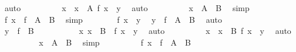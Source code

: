 \begin{isabellebody}
\begin{exercise}[subtitle=Svojstva funkcija]
\ auto\isanewline
\ \ \ \ \ \ \isamarkupfalse%
\ \isamarkupfalse%
\ x\ \ {\isachardoublequoteopen}x\ {\isasymin}\ A{\isachardoublequoteclose}\ {\isachardoublequoteopen}f\ x\ {\isacharequal}{\kern0pt}\ y{\isachardoublequoteclose}\ \isamarkupfalse%
\ auto\isanewline
\ \ \ \ \ \ \isamarkupfalse%
\ \isamarkupfalse%
\ {\isachardoublequoteopen}x\ {\isasymin}\ A\ {\isasymunion}\ B{\isachardoublequoteclose}\ \isamarkupfalse%
\ simp\isanewline
\ \ \ \ \ \ \isamarkupfalse%
\ \isamarkupfalse%
\ {\isachardoublequoteopen}f\ x\ {\isasymin}\ f\ {\isacharbackquote}{\kern0pt}\ {\isacharparenleft}{\kern0pt}A\ {\isasymunion}\ B{\isacharparenright}{\kern0pt}{\isachardoublequoteclose}\ \isamarkupfalse%
\ simp\isanewline
\ \ \ \ \ \ \isamarkupfalse%
\ {\isacartoucheopen}f\ x\ {\isacharequal}{\kern0pt}\ y{\isacartoucheclose}\ \isamarkupfalse%
\ {\isachardoublequoteopen}y\ {\isasymin}\ f\ {\isacharbackquote}{\kern0pt}\ {\isacharparenleft}{\kern0pt}A\ {\isasymunion}\ B{\isacharparenright}{\kern0pt}{\isachardoublequoteclose}\ \isamarkupfalse%
\ auto\ \isanewline
\ \ \ \ \isamarkupfalse%
\isanewline
\ \ \ \ \ \ \isamarkupfalse%
\ {\isachardoublequoteopen}y\ {\isasymin}\ f\ {\isacharbackquote}{\kern0pt}\ B{\isachardoublequoteclose}\isanewline
\ \ \ \ \ \ \isamarkupfalse%
\ \isamarkupfalse%
\ {\isachardoublequoteopen}{\isasymexists}\ x{\isachardot}{\kern0pt}\ x\ {\isasymin}\ B\ {\isasymand}\ f\ x\ {\isacharequal}{\kern0pt}\ y{\isachardoublequoteclose}\ \isamarkupfalse%
\ auto\isanewline
\ \ \ \ \ \ \isamarkupfalse%
\ \isamarkupfalse%
\ x\ \ {\isachardoublequoteopen}x\ {\isasymin}\ B{\isachardoublequoteclose}\ {\isachardoublequoteopen}f\ x\ {\isacharequal}{\kern0pt}\ y{\isachardoublequoteclose}\ \isamarkupfalse%
\ auto\isanewline
\ \ \ \ \ \ \isamarkupfalse%
\ \isamarkupfalse%
\ {\isachardoublequoteopen}x\ {\isasymin}\ A\ {\isasymunion}\ B{\isachardoublequoteclose}\ \isamarkupfalse%
\ simp\isanewline
\ \ \ \ \ \ \isamarkupfalse%
\ \isamarkupfalse%
\ {\isachardoublequoteopen}f\ x\ {\isasymin}\ f\ {\isacharbackquote}{\kern0pt}\ {\isacharparenleft}{\kern0pt}A\ {\isasymunion}\ B{\isacharparenright}{\kern0pt}{\isachardoublequoteclose}\ \isamarkupfalse%

\end{exercise}
\end{isabellebody}

